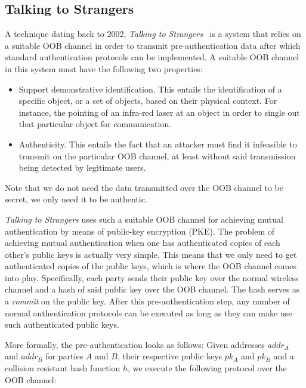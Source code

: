 \documentclass[conference, 12pt]{sty/IEEEtran}
\begin{document}
\subsection{Talking to Strangers}
\label{ssec:talking_to_strangers}

A technique dating back to 2002, \emph{Talking to Strangers}~\cite{balfanz2002talking} is a system that relies on a suitable OOB channel in order to transmit pre-authentication data after which standard authentication protocols can be implemented.
A suitable OOB channel in this system must have the following two properties:

\begin{itemize}
    \item Support demonstrative identification.
        This entails the identification of a specific object, or a set of objects, based on their physical context.
        For instance, the pointing of an infra-red laser at an object in order to single out that particular object for communication.
    \item Authenticity.
        This entails the fact that an attacker must find it infeasible to transmit on the particular OOB channel, at least without said transmission being detected by legitimate users.
\end{itemize}

Note that we do not need the data transmitted over the OOB channel to be secret, we only need it to be authentic.

\emph{Talking to Strangers} uses such a suitable OOB channel for achieving mutual authentication by means of public-key encryption (PKE).
The problem of achieving mutual authentication when one has authenticated copies of each other's public keys is actually very simple.
This means that we only need to get authenticated copies of the public keys, which is where the OOB channel comes into play.
Specifically, each party sends their public key over the normal wireless channel and a hash of said public key over the OOB channel.
The hash serves as a \emph{commit} on the public key.
After this pre-authentication step, any number of normal authentication protocols can be executed as long as they can make use such authenticated public keys.

More formally, the pre-authentication looks as follows:
Given addresses $addr_A$ and $addr_B$ for parties $A$ and $B$, their respective public keys $pk_A$ and $pk_B$ and a collision resistant hash function $h$, we execute the following protocol over the OOB channel:
\end{document}
